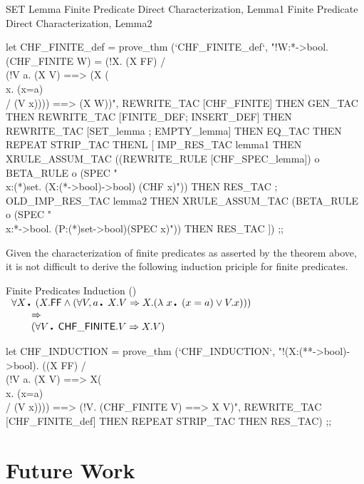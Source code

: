 \enddocs
{}
\endmoddef
\LA{}SET Lemma\RA{}
\LA{}Finite Predicate Direct Characterization, Lemma1\RA{}
\LA{}Finite Predicate Direct Characterization, Lemma2\RA{}

let CHF_FINITE_def = prove_thm 
  (`CHF_FINITE_def`,
   "!W:*->bool. (CHF_FINITE W) =
     (!X. (X FF) /\\ (!V a. (X V) ==> (X (\\x. (x=a) \\/ (V x))))  ==> (X W))",
   REWRITE_TAC [CHF_FINITE] THEN GEN_TAC
   THEN REWRITE_TAC [FINITE_DEF; INSERT_DEF]
   THEN REWRITE_TAC [SET_lemma ; EMPTY_lemma]
   THEN EQ_TAC THEN REPEAT STRIP_TAC
   THENL 
   [ IMP_RES_TAC lemma1
     THEN XRULE_ASSUM_TAC  
          ((REWRITE_RULE [CHF_SPEC_lemma]) o  BETA_RULE o (SPEC 
          "\\x:(*)set. (X:(*->bool)->bool) (CHF x)"))
     THEN RES_TAC ;
     OLD_IMP_RES_TAC lemma2
     THEN XRULE_ASSUM_TAC 
          (BETA_RULE o (SPEC "\\x:*->bool. (P:(*)set->bool)(SPEC x)"))
     THEN RES_TAC ]) ;;
\endcode
{}


Given the characterization of finite predicates as asserted by the
theorem above, it is not difficult to derive the following induction
priciple for finite predicates.

\begin{theorem}{Finite Predicates Induction 
()}
\label{pred.induct1}
\Eline
$\begin{array}{l}
  \qA X\Dot 
    (X.\FF \AND (\qA V,a\Dot X.V \IMP X.(\lambda\ x\Dot (x=a) \OR V.x))) \\
   \TAB \IMP \\
   \TAB (\qA V\Dot \CHFfin.V \IMP X.V)
\end{array}$
\end{theorem}

\enddocs
{}
\endmoddef
let CHF_INDUCTION = prove_thm (`CHF_INDUCTION`,
   "!(X:(**->bool)->bool). 
    ((X FF) /\\ (!V a. (X V) ==> X(\\x. (x=a) \\/ (V x))))
    ==>
    (!V. (CHF_FINITE  V) ==> X V)",
   REWRITE_TAC [CHF_FINITE_def] THEN REPEAT STRIP_TAC
   THEN RES_TAC) ;;
\endcode
{}




\chapter{Future Work}

